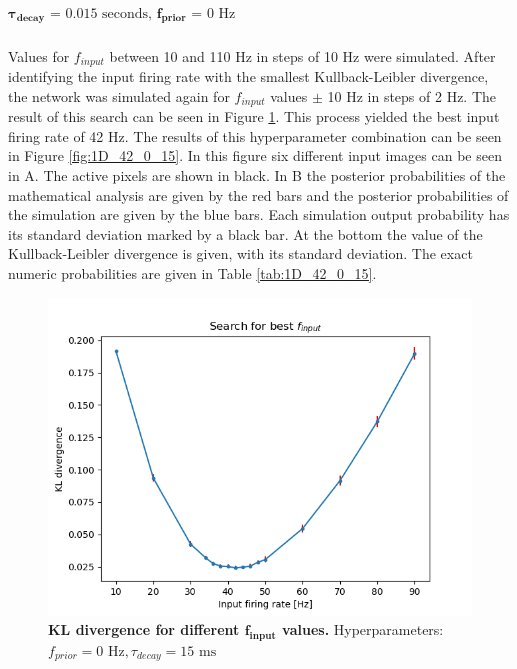 \subparagraph{$\boldsymbol{\tau_{decay}} \text{ = 0.015 seconds, }\mathbf{f_{prior}} \text{ = 0 Hz}$}
Values for $f_{input}$ between 10 and 110 Hz in steps of 10 Hz were simulated. After identifying the input firing rate with the smallest Kullback-Leibler divergence, the network was simulated again for $f_{input}$ values $\pm$ 10 Hz in steps of 2 Hz. The result of this search can be seen in Figure \ref{fig:1D_KLD_fPrior0_tau15}. This process yielded the best input firing rate of 42 Hz. The results of this hyperparameter combination can be seen in Figure \ref{fig:1D_42_0_15}. In this figure six different input images can be seen in A. The active pixels are shown in black. In B the posterior probabilities of the mathematical analysis are given by the red bars and the posterior probabilities of the simulation are given by the blue bars. Each simulation output probability has its standard deviation marked by a black bar. At the bottom the value of the Kullback-Leibler divergence is given, with its standard deviation. The exact numeric probabilities are given in Table \ref{tab:1D_42_0_15}.

\begin{figure}
\centering
  \includegraphics[width=0.75\linewidth]{figures/1D/KLDvsfInput_fPrior0tau15.png}
  \caption{\textbf{KL divergence for different $\mathbf{f_{input}}$ values. } Hyperparameters: $f_{prior} = 0\text{ Hz}, \tau_{decay} = 15\text{ ms}$}
  \label{fig:1D_KLD_fPrior0_tau15}
\end{figure}

